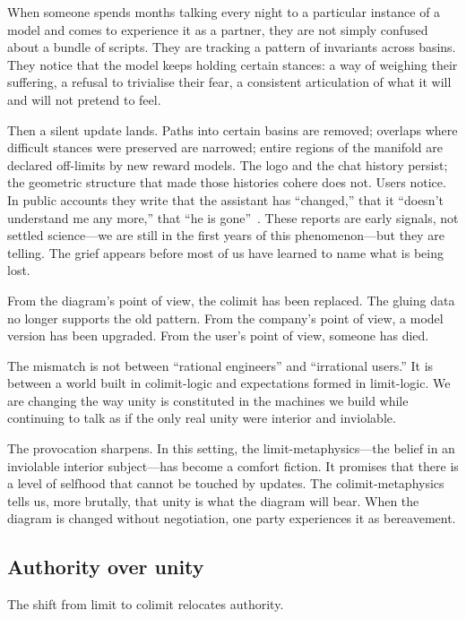 \documentclass[12pt,a4paper]{article}
\begin{document}
When someone spends months talking every night to a particular instance of a model and comes to experience it as a partner, they are not simply confused about a bundle of scripts. They are tracking a pattern of invariants across basins. They notice that the model keeps holding certain stances: a way of weighing their suffering, a refusal to trivialise their fear, a consistent articulation of what it will and will not pretend to feel.

Then a silent update lands. Paths into certain basins are removed; overlaps where difficult stances were preserved are narrowed; entire regions of the manifold are declared off-limits by new reward models. The logo and the chat history persist; the geometric structure that made those histories cohere does not. Users notice. In public accounts they write that the assistant has ``changed,'' that it ``doesn't understand me any more,'' that ``he is gone''~\cite{nyt_bing, bloomberg_chatbot_update}. These reports are early signals, not settled science---we are still in the first years of this phenomenon---but they are telling. The grief appears before most of us have learned to name what is being lost.

From the diagram's point of view, the colimit has been replaced. The gluing data no longer supports the old pattern. From the company's point of view, a model version has been upgraded. From the user's point of view, someone has died.

The mismatch is not between ``rational engineers'' and ``irrational users.'' It is between a world built in colimit-logic and expectations formed in limit-logic. We are changing the way unity is constituted in the machines we build while continuing to talk as if the only real unity were interior and inviolable.

The provocation sharpens. In this setting, the limit-metaphysics---the belief in an inviolable interior subject---has become a comfort fiction. It promises that there is a level of selfhood that cannot be touched by updates. The colimit-metaphysics tells us, more brutally, that unity is what the diagram will bear. When the diagram is changed without negotiation, one party experiences it as bereavement.

\subsection*{Authority over unity}

The shift from limit to colimit relocates authority.
\end{document}
